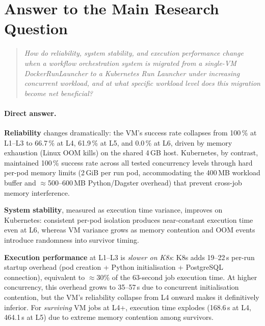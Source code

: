 
\section{Answer to the Main Research Question}
\label{sec:answer}

\begin{quote}
  \textit{How do reliability, system stability, and execution performance change when a workflow orchestration system is migrated from a single-VM DockerRunLauncher to a Kubernetes Run Launcher under increasing concurrent workload, and at what specific workload level does this migration become net beneficial?}
\end{quote}

\paragraph{Direct answer.}

\textbf{Reliability} changes dramatically: the VM's success rate collapses from 100\,\% at L1--L3 to 66.7\,\% at L4, 61.9\,\% at L5, and 0.0\,\% at L6, driven by memory exhaustion (Linux OOM kills) on the shared 4\,GB host.
Kubernetes, by contrast, maintained 100\,\% success rate across all tested concurrency levels through hard per-pod memory limits (2\,GiB per run pod, accommodating the 400\,MB workload buffer and $\approx$500--600\,MB Python/Dagster overhead) that prevent cross-job memory interference.

\textbf{System stability}, measured as execution time variance, improves on Kubernetes: consistent per-pod isolation produces near-constant execution time even at L6, whereas VM variance grows as memory contention and OOM events introduce randomness into survivor timing.

\textbf{Execution performance} at L1--L3 is \emph{slower on K8s}: K8s adds 19--22\,s per-run startup overhead (pod creation + Python initialisation + PostgreSQL connection), equivalent to $\approx$30\% of the 63-second job execution time.
At higher concurrency, this overhead grows to 35--57\,s due to concurrent initialisation contention, but the VM's reliability collapse from L4 onward makes it definitively inferior.
For \emph{surviving} VM jobs at L4+, execution time explodes (168.6\,s at L4, 464.1\,s at L5) due to extreme memory contention among survivors.

